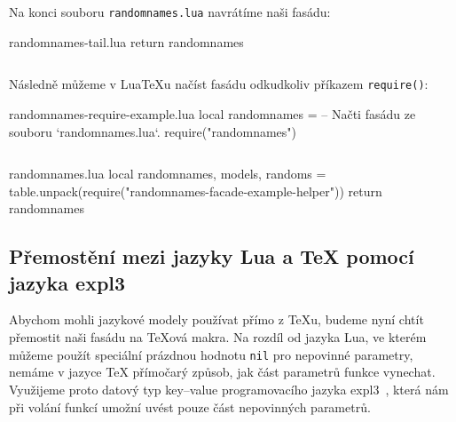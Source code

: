 \documentclass{csbulletin}
\newcommand\myinputminted[3][]{%
  \inputminted[#1]{#2}{#3}%
}
\newcommand\myinputminted[3][]{%
  \inputminted[#1]{#2}{code-placeholder.#2}%
}
\begin{document}
Na konci souboru \texttt{randomnames.lua} navrátíme naši fasádu:

\begin{filecontents}{randomnames-tail.lua}
return randomnames
\end{filecontents}
\myinputminted{lua}{randomnames-tail.lua}

\noindent
Následně můžeme v Lua\TeX u načíst fasádu odkudkoliv příkazem \texttt{require()}:

\begin{filecontents}{randomnames-require-example.lua}
local randomnames =  -- Načti fasádu ze souboru `randomnames.lua`.
   require("randomnames")
\end{filecontents}
\myinputminted[linenos=false]{lua}{randomnames-require-example.lua}

\begin{filecontents}{randomnames.lua}
local randomnames, models, randoms = table.unpack(require("randomnames-facade-example-helper"))
return randomnames
\end{filecontents}

\subsection{Přemostění mezi jazyky Lua a \TeX{} pomocí jazyka expl3}
\label{sec:rozhrani-premosteni}

Abychom mohli jazykové modely používat přímo z \TeX u, budeme nyní chtít přemostit naši fasádu na \TeX ová makra. Na rozdíl od jazyka Lua, ve kterém můžeme použít speciální prázdnou hodnotu \texttt{nil} pro nepovinné parametry, nemáme v jazyce \TeX{} přímočarý způsob, jak část parametrů funkce vynechat. Využijeme proto datový typ key--value programovacího jazyka expl3~\cite[kapitola~26]{latex2023interfaces}, která nám při volání funkcí umožní uvést pouze část nepovinných parametrů.
\end{document}
